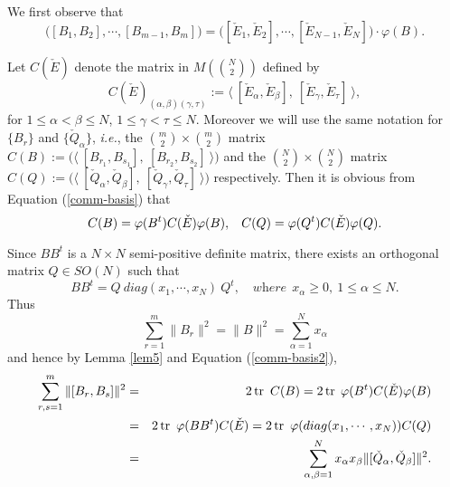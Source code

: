 \documentclass[a4paper,11pt]{amsart}
\numberwithin{equation}{section} \theoremstyle{plain}
\begin{document}
We first observe that
\begin{equation}\label{comm-basis}
\Big([B_1, B_2],\cdots,[B_{m-1}, B_m]\Big)=\Big([\check{E}_1, \check{E}_2],\cdots,[\check{E}_{N-1}, \check{E}_N]\Big)\cdot \varphi(B).
\end{equation}

 Let $C(\check{E})$ denote the matrix in $M(\binom{N}{2})$
defined by
\begin{equation}\label{comm-basis1}
C(\check{E})_{(\alpha,\beta)(\gamma,\tau)}:=\langle~
[\check{E}_{\alpha}, \check{E}_{\beta}],~ [\check{E}_{\gamma},
\check{E}_{\tau}]~ \rangle,
\end{equation}
for $1\leq\alpha<\beta\leq N$,
$1\leq\gamma<\tau\leq N$. Moreover we will use the same notation for
$\{B_r\}$ and $\{\check{Q}_{\alpha}\}$, \emph{i.e.}, the $\binom{m}{2}\times\binom{m}{2}$ matrix $C(B):=\Big(\langle~
[B_{r_1}, B_{s_1}],~ [B_{r_2}, B_{s_2}]~ \rangle\Big)$ and the $\binom{N}{2}\times\binom{N}{2}$ matrix $C(Q):=\Big(\langle~
[\check{Q}_{\alpha}, \check{Q}_{\beta}],~ [\check{Q}_{\gamma},
\check{Q}_{\tau}]~ \rangle\Big)$
respectively. Then it is obvious from Equation (\ref{comm-basis}) that
\begin{equation}\label{comm-basis2}
C(B)=\varphi(B^t)C(\check{E})\varphi(B), \hskip 0.3cm C(Q)=\varphi(Q^t)C(\check{E})\varphi(Q).
\end{equation}

Since $BB^t$ is a $N\times N$ semi-positive definite matrix, there
exists an orthogonal matrix $Q\in SO(N)$ such that
\begin{equation}\label{BBdiag}
BB^t=Q~diag(x_1,\cdots,x_N)~ Q^t, \quad \textit{where}~~x_{\alpha}\geq 0,~ 1\leq\alpha\leq N.
\end{equation}
Thus
\begin{equation}\label{BBnorm}
\sum_{r=1}^m\|B_r\|^2=\|B\|^2 =\sum_{\alpha=1}^Nx_{\alpha}
\end{equation}
 and
hence by Lemma \ref{lem5} and Equation (\ref{comm-basis2}),
\begin{eqnarray}\label{commtransf}
\sum_{r,s=1}^m\|[B_r, B_s]\|^2&=&2\operatorname{tr}~C(B)=2\operatorname{tr}\hskip 0.1cm
\varphi(B^t)C(\check{E})\varphi(B)\\
&=&2\operatorname{tr}~\varphi(BB^t)C(\check{E})=2\operatorname{tr}~
\varphi(diag(x_1,\cdots,x_N))C(Q)\nonumber\\
&=&\sum_{\alpha,\beta=1}^Nx_{\alpha}x_{\beta}\|[\check{Q}_{\alpha},
\check{Q}_{\beta}]\|^2.\nonumber
\end{eqnarray}
\end{document}
